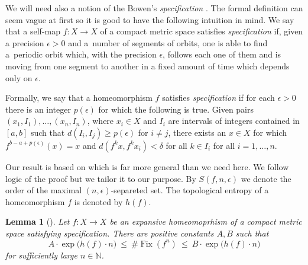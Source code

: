 \documentclass[oneside]{amsart}
\def\N{\mathbb{N}}
\def\Fix{\operatorname{Fix}}
\newtheorem{lem}[thm]{Lemma}
\begin{document}
We will need also a notion of the Bowen's \emph{specification} \cite{Bow}.
The formal definition can seem vague at first so it is good to have the following intuition in mind.
We say that a self-map $f: X \to X$ of a compact metric space satisfies \emph{specification}
if, given a precision $\epsilon>0$ and a~number of segments of orbits, one is able to find a~periodic orbit
which, with the precision $\epsilon$, follows each one of them and is moving from one segment to another
in a fixed amount of time which depends only on $\epsilon$.

Formally, we say that a homeomorphism $f$ satisfies \emph{specification} if for each $\epsilon > 0$
there is an integer $p(\epsilon)$ for which the following is true.
Given pairs $(x_1, I_1), \dots, (x_n, I_n)$, where $x_i \in X$ and $I_i$ are intervals of integers
contained in $[a,b]$ such that $d(I_i, I_j) \geq p(\epsilon)$ for $i \neq j$,
there exists an $x \in X$ for which $f^{b-a+p(\epsilon)}(x) = x$
and $d(f^kx, f^kx_i) < \delta$ for all $k \in I_i$ for all $i=1,\dots,n$.

Our result is based on \cite[Lemma~4]{Bow} which is far more general than we need here.
We follow logic of the proof but we tailor it to our purpose.
By $S(f,n,\epsilon)$ we denote the order of the maximal $(n,\epsilon)$-separeted set.
The topological entropy of a homeomorphism $f$ is denoted by $h(f)$.

\begin{lem}[] \label{thm:bowen-lemma4}
  Let $f: X \to X$ be an expansive homeomoprhism of a compact metric space satisfying specification.
  There are positive constants $A, B$ such that
  \begin{equation} \label{eq:bowen-lemma4}
    A \cdot \exp \big( h(f) \cdot n \big)
      \ \leq \ \#\Fix(f^n)
      \ \leq \ B \cdot \exp \big( h(f) \cdot n \big)
  \end{equation}
  for sufficiently large $n \in \N$.
\end{lem}
\end{document}

